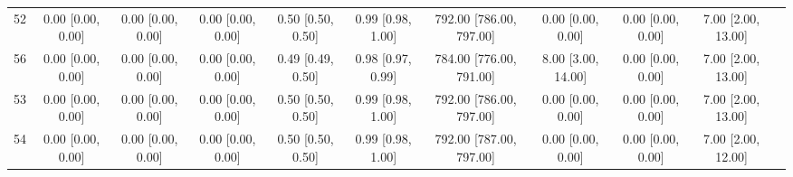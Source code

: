 \documentclass[8pt]{article}
\begin{document}
\begin{center}
\begin{footnotesize}
\begin{longtable}{|ccccccccccc|}
 52 &  0.00 [0.00, 0.00] &  0.00 [0.00, 0.00] &  0.00 [0.00, 0.00] &  0.50 [0.50, 0.50] &  0.99 [0.98, 1.00] &  792.00 [786.00, 797.00] &        0.00 [0.00, 0.00] &   0.00 [0.00, 0.00] &  7.00 [2.00, 13.00] \\
 56 &  0.00 [0.00, 0.00] &  0.00 [0.00, 0.00] &  0.00 [0.00, 0.00] &  0.49 [0.49, 0.50] &  0.98 [0.97, 0.99] &  784.00 [776.00, 791.00] &       8.00 [3.00, 14.00] &   0.00 [0.00, 0.00] &  7.00 [2.00, 13.00] \\
 53 &  0.00 [0.00, 0.00] &  0.00 [0.00, 0.00] &  0.00 [0.00, 0.00] &  0.50 [0.50, 0.50] &  0.99 [0.98, 1.00] &  792.00 [786.00, 797.00] &        0.00 [0.00, 0.00] &   0.00 [0.00, 0.00] &  7.00 [2.00, 13.00] \\
 54 &  0.00 [0.00, 0.00] &  0.00 [0.00, 0.00] &  0.00 [0.00, 0.00] &  0.50 [0.50, 0.50] &  0.99 [0.98, 1.00] &  792.00 [787.00, 797.00] &        0.00 [0.00, 0.00] &   0.00 [0.00, 0.00] &  7.00 [2.00, 12.00] \\
\end{longtable}
\end{footnotesize}
\end{center}
\end{document}
